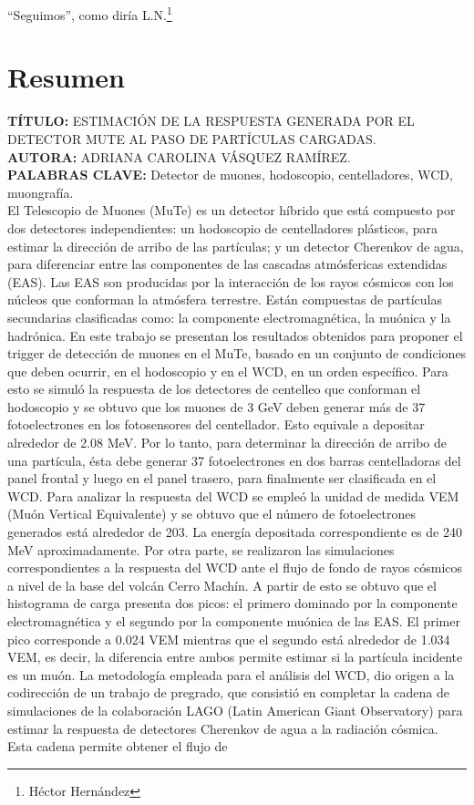 \documentclass[12pt,oneside,openany,letter]{book}
\begin{document}
``Seguimos'', como dir\'ia L.N.\footnote{H\'ector Hern\'andez}






\tableofcontents
\listoffigures
\chapter*{Resumen}
{\footnotesize \textbf{T\'ITULO:} ESTIMACI\'ON DE LA RESPUESTA GENERADA POR EL DETECTOR MUTE AL PASO DE PART\'ICULAS CARGADAS.\\
\textbf{AUTORA:} ADRIANA CAROLINA V\'ASQUEZ RAM\'IREZ.\\
\textbf{PALABRAS CLAVE:} Detector de muones, hodoscopio, centelladores, WCD, muongraf\'ia.\\
El Telescopio de Muones (MuTe) es un detector h\'ibrido que est\'a compuesto por dos detectores independientes: un hodoscopio de centelladores pl\'asticos, para estimar la direcci\'on de arribo de las part\'iculas; y un detector Cherenkov de agua, para diferenciar entre las componentes de las cascadas atm\'osfericas extendidas (EAS). Las EAS son producidas por la interacci\'on de los rayos c\'osmicos con los n\'ucleos que conforman la atm\'osfera terrestre. Est\'an compuestas de part\'iculas secundarias clasificadas como: la componente electromagn\'etica, la mu\'onica y la hadr\'onica. En este trabajo se presentan los resultados obtenidos para proponer el trigger de detecci\'on de muones en el MuTe, basado en un conjunto de condiciones que deben ocurrir, en el hodoscopio y en el WCD, en un orden espec\'ifico. Para esto se simuló la respuesta de los detectores de centelleo que conforman el hodoscopio y se obtuvo que los muones de 3 GeV deben generar m\'as de 37 fotoelectrones en los fotosensores del centellador. Esto equivale a depositar alrededor de 2.08 MeV. Por lo tanto, para determinar la direcci\'on de arribo de una part\'icula, \'esta debe generar 37 fotoelectrones en dos barras centelladoras del panel frontal y luego en el panel trasero, para finalmente ser clasificada en el WCD. Para analizar la respuesta del WCD se emple\'o la unidad de medida VEM (Mu\'on Vertical Equivalente) y se obtuvo que el n\'umero de fotoelectrones generados est\'a alrededor de 203. La energ\'ia depositada correspondiente es de 240 MeV aproximadamente. Por otra parte, se realizaron las simulaciones correspondientes a la respuesta del WCD ante el flujo de fondo de rayos c\'osmicos a nivel de la base del volc\'an Cerro Mach\'in. A partir de esto se obtuvo que el histograma de carga presenta dos picos: el primero dominado por la componente electromagn\'etica y el segundo por la componente mu\'onica de las EAS. El primer pico corresponde a 0.024 VEM mientras que el segundo est\'a alrededor de 1.034 VEM, es decir, la diferencia entre ambos permite estimar si la part\'icula incidente es un mu\'on. La metodolog\'ia empleada para el an\'alisis del WCD, dio origen a la codirección de un trabajo de pregrado, que consisti\'o en completar la cadena de simulaciones de la colaboraci\'on LAGO (Latin American Giant Observatory) para estimar la respuesta de detectores Cherenkov de agua a la radiaci\'on c\'osmica. Esta cadena permite obtener el flujo de }
\end{document}
